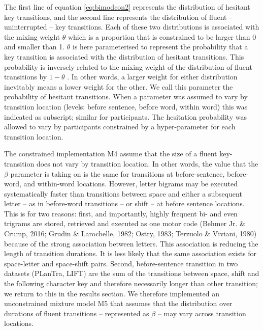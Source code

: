 \documentclass[
  man,floatsintext]{apa7}
\begin{document}
The first line of equation \ref{eq:bimodcon2} represents the distribution of hesitant key transitions, and the second line represents the distribution of fluent -- uninterrupted -- key transitions. Each of these two distributions is associated with the mixing weight \(\theta\) which is a proportion that is constrained to be larger than 0 and smaller than 1. \(\theta\) is here parameterised to represent the probability that a key transition is associated with the distribution of hesitant transitions. This probability is inversely related to the mixing weight of the distribution of fluent transitions by \(1-\theta\) . In other words, a larger weight for either distribution inevitably means a lower weight for the other. We call this parameter the probability of hesitant transitions. When a parameter was assumed to vary by transition location (levels: before sentence, before word, within word) this was indicated as subscript; similar for participants. The hesitation probability was allowed to vary by participants constrained by a hyper-parameter for each transition location.

The constrained implementation M4 assume that the size of a fluent key-transition does not vary by transition location. In other words, the value that the \(\beta\) parameter is taking on is the same for transitions at before-sentence, before-word, and within-word locations. However, letter bigrams may be executed systematically faster than transitions between space and either a subsequent letter -- as in before-word transitions -- or shift -- at before sentence locations. This is for two reasons: first, and importantly, highly frequent bi- and even trigrams are stored, retrieved and executed as one motor code (Behmer Jr. \& Crump, 2016; Grudin \& Larochelle, 1982; Ostry, 1983; Terzuolo \& Viviani, 1980) because of the strong association between letters. This association is reducing the length of transition durations. It is less likely that the same association exists for space-letter and space-shift pairs. Second, before-sentence transition in two datasets (PLanTra, LIFT) are the sum of the transitions between space, shift and the following character key and therefore necessarily longer than other transition; we return to this in the results section. We therefore implemented an unconstrained mixture model M5 that assumes that the distribution over durations of fluent transitions -- represented as \(\beta\) -- may vary across transition locations.
\end{document}
